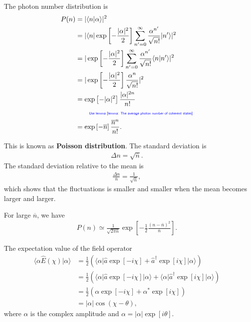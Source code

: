 \documentclass[../../note.tex]{subfiles}
\begin{document}
\begin{lemma}
    The photon number distribution is
    \begin{align}
        P(n)
        &= \vert \langle n \vert \alpha \rangle \vert^2 \\
        &= \vert \langle n \vert \exp\left[-\frac{\vert \alpha \vert^2}{2}\right] \sum_{n^\prime=0}^{\infty} \frac{\alpha^{n^\prime}}{\sqrt{n !}} \vert n^{\prime} \rangle \vert^2 \\
        &= \vert \exp\left[-\frac{\vert \alpha \vert^2}{2}\right] \sum_{n^\prime=0}^{\infty} \frac{\alpha^{n^\prime}}{\sqrt{n !}} \langle n \vert n^{\prime} \rangle \vert^2 \\
        &= \vert \exp\left[-\frac{\vert \alpha \vert^2}{2}\right]  \frac{\alpha^{n}}{\sqrt{n !}}  \vert^2 \\
        &= \exp\left[-\vert \alpha \vert^2 \right] \frac{\vert \alpha\vert^{2 n}}{n !} \\
        &\qquad\text{\color{blue}{\tiny\sffamily Use lemma \ref{lemma: The average photon number of coherent states}}} \nonumber \\
        &= \exp\left[- \overline{n}\right] \frac{\overline{n}^n}{n !}.
    \end{align}
\end{lemma}

This is known as \textbf{Poisson distribution}. The standard deviation is
\begin{align}
    \Delta n = \sqrt{\overline{n}}.
\end{align}
The standard deviation relative to the mean is
\begin{align}
    \frac{\Delta n}{\overline{n}} = \frac{1}{\sqrt{\overline{n}}},
\end{align}
which shows that the fluctuations is smaller and smaller when the mean becomes larger and larger.

For large $\overline{n}$, we have
\begin{align}
    P(n) \simeq \frac{1}{\sqrt{2 \pi \overline{n}}} \exp\left[- \frac{1}{2} \frac{(n-\overline{n})^2}{\overline{n}}\right].
\end{align}

\begin{lemma}
    The expectation value of the field operator
    \begin{align}
        \langle \alpha \hat{E}(\chi) \vert \alpha \rangle 
        &= \frac{1}{2} (\langle \alpha \vert \hat{a} \exp\left[-i \chi\right] + \hat{a}^\dagger \exp\left[i \chi\right] \vert \alpha \rangle) \\
        &= \frac{1}{2}\left(\langle \alpha \vert \hat{a}\exp\left[-i \chi\right] \vert \alpha \rangle + \langle \alpha \vert \hat{a}^\dagger\exp\left[i \chi\right] \vert \alpha \rangle \right) \\
        &= \frac{1}{2}\left(\alpha \exp\left[-i \chi \right]+ \alpha^\ast \exp\left[i \chi\right]\right) \\
        &= \vert \alpha \vert \cos\left(\chi - \theta \right),
    \end{align}
    where $\alpha$ is the complex amplitude and $\alpha = \vert \alpha \vert \exp\left[i \theta \right]$.
\end{lemma}
\end{document}
